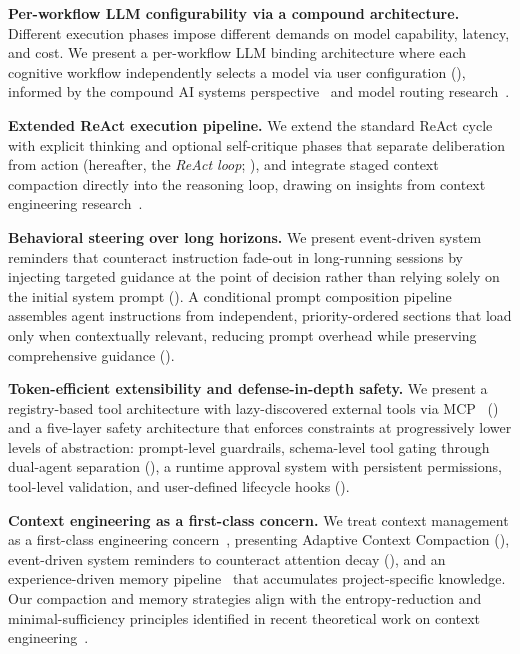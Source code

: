 \begin{packedenumerate}
\item \textbf{Per-workflow LLM configurability via a compound architecture.} Different execution phases impose different demands on model capability, latency, and cost. We present a per-workflow LLM binding architecture where each cognitive workflow independently selects a model via user configuration (), informed by the compound AI systems perspective~\cite{zaharia2024compound} and model routing research~\cite{ong2024routellm}.

\item \textbf{Extended ReAct execution pipeline.} We extend the standard ReAct cycle~\cite{yao2023react} with explicit thinking and optional self-critique phases that separate deliberation from action (hereafter, the \emph{ReAct loop}; ), and integrate staged context compaction directly into the reasoning loop, drawing on insights from context engineering research~\cite{mei2025survey, hua2025context}.

\item \textbf{Behavioral steering over long horizons.} We present event-driven system reminders that counteract instruction fade-out in long-running sessions by injecting targeted guidance at the point of decision rather than relying solely on the initial system prompt (). A conditional prompt composition pipeline assembles agent instructions from independent, priority-ordered sections that load only when contextually relevant, reducing prompt overhead while preserving comprehensive guidance ().

\item \textbf{Token-efficient extensibility and defense-in-depth safety.} We present a registry-based tool architecture with lazy-discovered external tools via MCP~\cite{anthropic2024mcp} () and a five-layer safety architecture that enforces constraints at progressively lower levels of abstraction: prompt-level guardrails, schema-level tool gating through dual-agent separation (), a runtime approval system with persistent permissions, tool-level validation, and user-defined lifecycle hooks ().

\item \textbf{Context engineering as a first-class concern.} We treat context management as a first-class engineering concern~\cite{anthropic2025context_engineering, mei2025survey}, presenting Adaptive Context Compaction (), event-driven system reminders to counteract attention decay (), and an experience-driven memory pipeline~\cite{packer2023memgpt, experepair} that accumulates project-specific knowledge. Our compaction and memory strategies align with the entropy-reduction and minimal-sufficiency principles identified in recent theoretical work on context engineering~\cite{hua2025context, ye2026meta}.
\end{packedenumerate}

